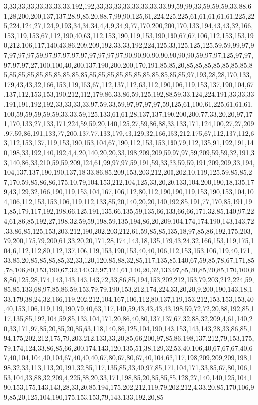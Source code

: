3,33,33,33,33,33,33,33,192,192,33,33,33,33,33,33,33,33,99,59,99,33,59,59,59,33,88,61,28,200,200,137,137,28,9,85,20,88,7,99,90,125,61,224,225,225,61,61,61,61,61,225,225,224,124,27,124,9,193,34,34,34,4,4,9,34,9,77,170,200,200,170,133,194,43,43,32,166,153,119,153,67,112,190,40,63,112,153,190,119,153,190,190,67,67,106,112,153,153,190,212,106,117,140,43,86,209,209,192,33,33,192,224,125,33,125,125,125,59,59,99,97,97,97,97,97,59,97,97,97,97,97,97,97,97,97,90,90,90,90,90,90,90,90,59,97,97,125,97,97,97,97,97,27,100,100,40,200,137,190,200,200,170,191,85,85,20,85,85,85,85,85,85,85,85,85,85,85,85,85,85,85,85,85,85,85,85,85,85,85,85,85,85,85,85,97,193,28,28,170,133,179,43,43,32,166,153,119,153,67,112,137,112,63,112,190,106,119,153,137,190,104,67,137,112,153,153,190,212,112,179,86,33,86,59,125,192,88,59,33,124,224,191,33,33,33,191,191,192,192,33,33,33,33,97,59,33,59,97,97,97,97,59,125,61,100,61,225,61,61,61,100,59,59,59,59,59,33,33,59,125,133,61,61,28,137,137,190,200,200,77,33,20,20,97,171,170,133,27,133,171,224,59,59,20,140,125,27,59,86,88,33,133,171,124,100,27,27,209,97,59,86,191,133,77,200,137,77,133,179,43,129,32,166,153,212,175,67,112,137,112,63,112,153,137,119,153,190,153,104,67,190,112,153,153,190,79,112,135,91,192,191,140,198,33,192,140,192,4,4,20,140,20,20,33,198,209,209,59,97,97,59,209,59,59,32,191,33,140,86,33,210,59,59,209,124,61,99,97,97,59,191,59,33,33,59,59,191,209,209,33,194,104,137,137,190,190,137,18,33,86,85,209,153,203,212,200,202,10,119,125,59,85,85,27,170,59,85,86,86,175,10,79,104,153,212,104,125,33,20,20,133,104,200,190,18,135,179,43,129,32,166,190,119,153,104,167,106,112,80,112,190,190,119,153,190,153,104,104,106,112,153,153,106,119,112,133,85,20,140,20,20,140,192,85,191,77,170,85,191,191,85,179,117,192,198,66,125,191,135,66,135,59,135,66,133,66,66,171,32,85,140,97,224,61,86,85,192,27,198,32,59,59,198,59,135,194,86,20,209,104,174,174,190,143,143,72,33,86,85,125,153,203,212,190,202,203,212,61,59,85,85,135,18,97,85,86,192,175,203,79,200,175,79,200,61,33,20,20,171,28,174,143,18,135,179,43,24,32,166,153,119,175,104,6,112,112,80,112,137,106,119,153,190,153,40,40,106,112,153,153,106,119,40,171,33,85,20,85,85,85,85,32,33,120,120,85,88,32,85,117,135,85,140,67,59,85,78,67,171,85,78,106,80,153,190,67,32,140,32,97,124,61,140,20,32,133,97,85,20,85,20,85,170,100,88,86,125,28,174,143,143,143,143,72,33,86,85,194,153,202,212,153,79,203,212,224,59,85,85,133,68,97,85,86,59,153,79,79,190,153,212,174,224,33,20,20,9,200,190,143,18,133,179,38,24,32,166,119,202,212,104,167,106,112,80,137,119,153,212,153,153,153,40,40,153,106,119,119,190,79,40,63,117,140,59,43,43,43,43,198,59,72,72,20,88,192,85,117,135,85,192,104,59,85,133,104,171,20,86,40,80,137,137,67,32,88,32,209,4,61,140,20,33,171,97,85,20,85,20,85,63,118,140,86,125,104,190,143,153,143,143,28,33,86,85,194,175,202,212,175,79,203,212,133,33,20,85,66,200,97,85,86,198,137,212,79,153,175,79,174,124,33,86,85,66,200,174,143,120,135,51,38,129,32,53,40,106,40,67,67,67,40,67,40,104,104,40,104,67,40,40,40,67,80,67,80,67,40,104,63,117,198,209,209,209,198,198,32,33,113,113,20,191,32,85,117,135,85,33,40,97,85,171,104,171,33,85,67,80,106,153,104,33,88,32,209,4,225,88,20,33,171,198,85,20,85,85,85,128,27,140,140,125,104,190,153,175,143,143,28,33,20,85,194,175,202,212,119,79,202,212,4,33,20,85,170,106,99,85,20,125,104,190,175,153,153,79,143,133,192,20,85